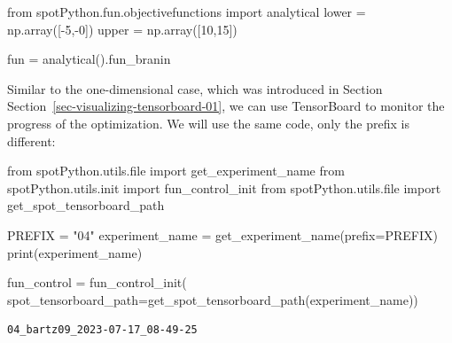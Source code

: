 \documentclass[
  letterpaper,
  DIV=11,
  numbers=noendperiod]{scrreprt}
\newenvironment{Shaded}{\begin{snugshade}}{\end{snugshade}}
\newcommand{\BuiltInTok}[1]{\textcolor[rgb]{0.00,0.23,0.31}{#1}}
\newcommand{\DecValTok}[1]{\textcolor[rgb]{0.68,0.00,0.00}{#1}}
\newcommand{\ImportTok}[1]{\textcolor[rgb]{0.00,0.46,0.62}{#1}}
\newcommand{\NormalTok}[1]{\textcolor[rgb]{0.00,0.23,0.31}{#1}}
\newcommand{\OperatorTok}[1]{\textcolor[rgb]{0.37,0.37,0.37}{#1}}
\newcommand{\StringTok}[1]{\textcolor[rgb]{0.13,0.47,0.30}{#1}}
\begin{document}
\begin{Shaded}
\begin{Highlighting}[]
\ImportTok{from}\NormalTok{ spotPython.fun.objectivefunctions }\ImportTok{import}\NormalTok{ analytical}
\NormalTok{lower }\OperatorTok{=}\NormalTok{ np.array([}\OperatorTok{{-}}\DecValTok{5}\NormalTok{,}\OperatorTok{{-}}\DecValTok{0}\NormalTok{])}
\NormalTok{upper }\OperatorTok{=}\NormalTok{ np.array([}\DecValTok{10}\NormalTok{,}\DecValTok{15}\NormalTok{])}
\end{Highlighting}
\end{Shaded}

\begin{Shaded}
\begin{Highlighting}[]
\NormalTok{fun }\OperatorTok{=}\NormalTok{ analytical().fun\_branin}
\end{Highlighting}
\end{Shaded}

\begin{tcolorbox}[enhanced jigsaw, left=2mm, title=\textcolor{quarto-callout-note-color}{\faInfo}\hspace{0.5em}{TensorBoard}, bottomrule=.15mm, titlerule=0mm, breakable, rightrule=.15mm, toprule=.15mm, coltitle=black, colbacktitle=quarto-callout-note-color!10!white, leftrule=.75mm, arc=.35mm, colframe=quarto-callout-note-color-frame, bottomtitle=1mm, colback=white, opacitybacktitle=0.6, toptitle=1mm, opacityback=0]

Similar to the one-dimensional case, which was introduced in Section
Section~\ref{sec-visualizing-tensorboard-01}, we can use TensorBoard to
monitor the progress of the optimization. We will use the same code,
only the prefix is different:

\begin{Shaded}
\begin{Highlighting}[]
\ImportTok{from}\NormalTok{ spotPython.utils.}\BuiltInTok{file} \ImportTok{import}\NormalTok{ get\_experiment\_name}
\ImportTok{from}\NormalTok{ spotPython.utils.init }\ImportTok{import}\NormalTok{ fun\_control\_init}
\ImportTok{from}\NormalTok{ spotPython.utils.}\BuiltInTok{file} \ImportTok{import}\NormalTok{ get\_spot\_tensorboard\_path}

\NormalTok{PREFIX }\OperatorTok{=} \StringTok{"04"}
\NormalTok{experiment\_name }\OperatorTok{=}\NormalTok{ get\_experiment\_name(prefix}\OperatorTok{=}\NormalTok{PREFIX)}
\BuiltInTok{print}\NormalTok{(experiment\_name)}

\NormalTok{fun\_control }\OperatorTok{=}\NormalTok{ fun\_control\_init(}
\NormalTok{    spot\_tensorboard\_path}\OperatorTok{=}\NormalTok{get\_spot\_tensorboard\_path(experiment\_name))}
\end{Highlighting}
\end{Shaded}

\begin{verbatim}
04_bartz09_2023-07-17_08-49-25
\end{verbatim}

\end{tcolorbox}
\end{document}
